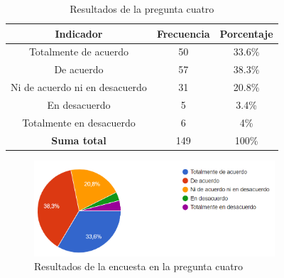 \begin{table}[H]
        \centering
        \caption{Resultados de la pregunta cuatro}
        \begin{footnotesize}
        \begin{tabular}{|c|c|c|}
            \hline
            \textbf{Indicador} & \textbf{Frecuencia} &  \textbf{Porcentaje} \\
            \hline
            Totalmente de acuerdo & 50 & 33.6\% \\
            \hline
            De acuerdo & 57 & 38.3\% \\
            \hline
            Ni de acuerdo ni en desacuerdo & 31 & 20.8\% \\
            \hline
            En desacuerdo & 5 & 3.4\% \\
            \hline
            Totalmente en desacuerdo & 6 & 4\% \\
            \hline
            \textbf{Suma total} & 149 & 100\% \\
            \hline
        \end{tabular}\label{tab:table_preg_4}
        \end{footnotesize}
    \end{table}

    \begin{figure}[H]
        \centering
        \includegraphics[width=0.8\textwidth]{resources/images/p4}
        \caption{Resultados de la encuesta en la pregunta cuatro}\label{fig:figure_p4}
    \end{figure}

